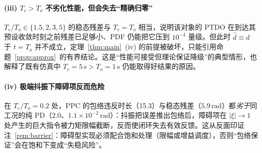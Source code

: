 \paragraph{(iii) \(T_c>T_o\) 不劣化性能，但会失去“精确归零”}
\(T_c/T_o\in\{1.5,2,3,5\}\) 的稳态残差与 \(T_c=T_o\) 相当，说明该对象的 PTDO 在到达其预设收敛时刻之前残差已足够小、PDF 仍能把它压到 \(10^{-4}\) 量级。但此时 \(\hat d\equiv d\) 于 \(t=T_o\) 并不成立，定理~\ref{thm:main}~(iv) 的前提被破坏，只能引用命题~\ref{prop:approx}~的有界结论。这是“性能可接受但理论保证降级”的典型情形，也解释了既有仿真中 \(T_c=5\,\mathrm{s}>T_o=1\,\mathrm{s}\) 仍能取得好结果的原因。

\paragraph{(iv) 极端抖振下障碍项反而危险}
在 \(T_c/T_o=0.2\) 处，PPC 的包络违反时长（15.3）与稳态残差（\(5.9\,\mathrm{rad}\)）都\emph{劣于}同工况的纯 PD（\(2.0\)、\(1.1\times10^{-2}\,\mathrm{rad}\)）：抖振把误差推出包络后，障碍项在 \(\lvert\xi\rvert\to1\) 处产生的巨大指令被力矩限幅截断，反而使闭环失去有效反馈。这从反面印证注~\ref{rem:barrier}：障碍型实现必须配合饱和处理（限幅或增益调度），否则“包络保证”会在饱和下变成“失稳风险”。

